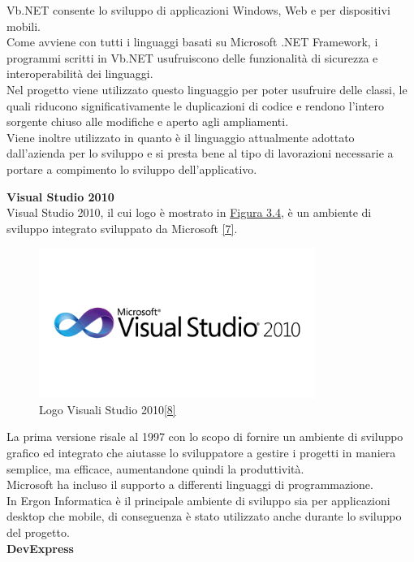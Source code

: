 Vb.NET consente lo sviluppo di applicazioni Windows, Web e per dispositivi mobili. \\
Come avviene con tutti i linguaggi basati su Microsoft .NET Framework,
i programmi scritti in Vb.NET usufruiscono delle funzionalità di sicurezza e interoperabilità dei linguaggi.\\
Nel progetto viene utilizzato questo linguaggio per poter usufruire delle classi, le quali riducono significativamente le duplicazioni di codice e rendono l'intero sorgente 
chiuso alle modifiche e aperto agli ampliamenti. \\Viene inoltre utilizzato in quanto è il linguaggio attualmente adottato dall'azienda per lo sviluppo e si presta bene
al tipo di lavorazioni necessarie a portare a compimento lo sviluppo dell'applicativo.

\newpage
\textbf{Visual Studio 2010}\\
Visual Studio 2010, il cui logo è mostrato in \hyperref[vs-2010]{Figura 3.4}, è un ambiente di sviluppo integrato sviluppato da Microsoft \hyperref[vs]{[7]}. 
\begin{figure}[H]
	\includegraphics[width=9cm]{immagini/microsoft-visual-studio-2010-logo.png}
	\centering
	\caption{Logo Visuali Studio 2010\hyperref[vs-logo]{[8]}}
	\label{vs-2010}
\end{figure}


La prima versione risale al 1997 con lo scopo di fornire
un ambiente di sviluppo grafico ed integrato che aiutasse lo sviluppatore a gestire i progetti in maniera semplice, ma efficace, aumentandone quindi la produttività.\\
Microsoft ha incluso il supporto a differenti linguaggi di programmazione.\\
In Ergon Informatica è il principale ambiente di sviluppo sia per applicazioni desktop che mobile, di conseguenza è stato utilizzato anche durante lo sviluppo del progetto.\\

\textbf{DevExpress}\\

